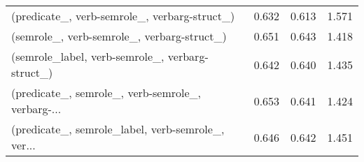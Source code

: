 \begin{tabular}{lrrr}
      (predicate\_, verb-semrole\_, verbarg-struct\_) &        0.632 &         0.613 &  1.571 \\
        (semrole\_, verb-semrole\_, verbarg-struct\_) &        0.651 &         0.643 &  1.418 \\
   (semrole\_label, verb-semrole\_, verbarg-struct\_) &        0.642 &         0.640 &  1.435 \\
 (predicate\_, semrole\_, verb-semrole\_, verbarg-... &        0.653 &         0.641 &  1.424 \\
 (predicate\_, semrole\_label, verb-semrole\_, ver... &        0.646 &         0.642 &  1.451 \\
\bottomrule
\end{tabular}
